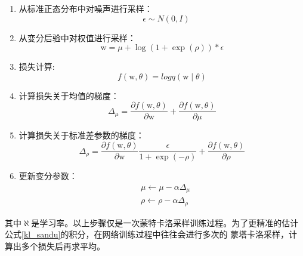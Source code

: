 \begin{enumerate}
	\item 从标准正态分布中对噪声进行采样：
	\begin{equation}
		\label{}
		\quad \epsilon \sim N(0, I)
	\end{equation}
	\item 从变分后验中对权值进行采样：
	\begin{equation}
		\label{}
		\mathrm{w}=\mu+\log (1+\exp (\rho)) * \epsilon
	\end{equation}
	\item 损失计算:
	\begin{equation}
		\label{}
		f(\mathrm{w},\theta)= logq(\mathrm{w}\mid\theta)
	\end{equation}
	\item 计算损失关于均值的梯度：
	\begin{equation}
		\label{}
		\Delta_\mu=\frac{\partial f(\mathrm{w}, \theta)}{\partial \mathrm{w}}+\frac{\partial f(\mathrm{w}, \theta)}{\partial \mu}
	\end{equation}
	\item 计算损失关于标准差参数的梯度：
	\begin{equation}
		\label{}
		\Delta_\rho=\frac{\partial f(\mathrm{w}, \theta)}{\partial \mathrm{w}} \frac{\epsilon}{1+\exp (-\rho)}+\frac{\partial f(\mathrm{w}, \theta)}{\partial \rho}
	\end{equation}
	\item 更新变分参数：
	\begin{equation}
		\label{}
		\begin{aligned}
		& \mu \leftarrow \mu-\alpha \Delta_\mu \\
		& \rho \leftarrow \rho-\alpha \Delta_\rho
		\end{aligned}
	\end{equation}
\end{enumerate}
其中$\aleph$是学习率。以上步骤仅是一次蒙特卡洛采样训练过程。为了更精准的估计公式\eqref{kl_sandu}的积分，在网络训练过程中往往会进行多次的
蒙塔卡洛采样，计算出多个损失后再求平均。

